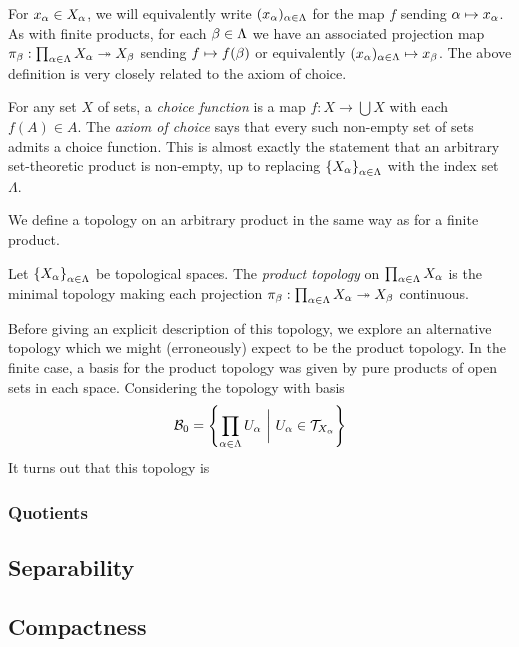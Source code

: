 \documentclass[11pt]{article}
\begin{document}
For $x_\alpha \in X_\alpha$, we will equivalently write $(x_\alpha)_{\alpha \in \Lambda}$ for the map $f$ sending $\alpha \mapsto x_\alpha$. As with finite products, for each $\beta \in \Lambda$ we have an associated projection map $\pi_\beta : \prod_{\alpha \in \Lambda} X_\alpha \twoheadrightarrow X_\beta$ sending $f \mapsto f(\beta)$ or equivalently $(x_\alpha)_{\alpha \in \Lambda} \mapsto x_\beta$. The above definition is very closely related to the axiom of choice.
\begin{remark}
    For any set $X$ of sets, a \emph{choice function} is a map $f : X \to \bigcup X$ with each $f(A) \in A$. The \emph{axiom of choice} says that every such non-empty set of sets admits a choice function. This is almost exactly the statement that an arbitrary set-theoretic product is non-empty, up to replacing $\left\{  X_\alpha  \right\}_{\alpha \in \Lambda}$ with the index set $\Lambda$.
\end{remark}
We define a topology on an arbitrary product in the same way as for a finite product.
\begin{definition}
    Let $\left\{  X_\alpha  \right\}_{\alpha \in \Lambda}$ be topological spaces. The \emph{product topology} on $\prod_{\alpha \in \Lambda} X_\alpha$ is the minimal topology making each projection $\pi_\beta : \prod_{\alpha \in \Lambda} X_\alpha \twoheadrightarrow X_\beta$ continuous.
\end{definition}
Before giving an explicit description of this topology, we explore an alternative topology which we might (erroneously) expect to be the product topology. In the finite case, a basis for the product topology was given by pure products of open sets in each space. Considering the topology with basis
$$
    \mathcal{B}_0 = \left\{  \prod_{\alpha \in \Lambda} U_\alpha \ \bigg| \ U_\alpha \in \mathcal{T}_{X_\alpha}  \right\}
$$
It turns out that this topology is 

\subsubsection{Quotients}



\subsection{Separability}

% 


\subsection{Compactness}
\end{document}
